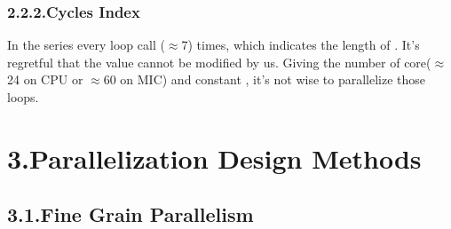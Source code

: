 \documentclass{article}
\begin{document}
\subsubsection{2.2.2.\hspace*{0.5em}Cycles Index}\label{sec-cycles-index}%

\noindent{}In the  series every loop call  (\ensuremath{\approx}7) times, which indicates the length of . It's regretful that the value cannot be modified by us. Giving the number of core(\ensuremath{\approx}24 on CPU or \ensuremath{\approx}60 on MIC) and constant , it's not wise to parallelize those loops.%

\section{3.\hspace*{0.5em}Parallelization Design Methods}\label{sec-parallelization-design-methods}%

\subsection{3.1.\hspace*{0.5em}Fine Grain Parallelism}\label{sec-fine-grain-parallelism}%
\end{document}
